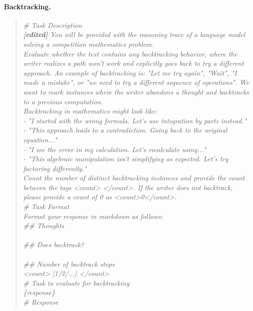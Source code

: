 \paragraph{Backtracking.}
\begin{quote}\small\itshape
\# Task Description\\
\textbf{[edited]} You will be provided with the reasoning trace of a language model solving a competition mathematics problem.\\
Evaluate whether the text contains any backtracking behavior, where the writer realizes a path won't work and explicitly goes back to try a different approach. An example of backtracking is: "Let me try again", "Wait", "I made a mistake", or "we need to try a different sequence of operations". We want to mark instances where the writer abandons a thought and backtracks to a previous computation.\\
\medskip
Backtracking in mathematics might look like:\\
- "I started with the wrong formula. Let's use integration by parts instead."\\
- "This approach leads to a contradiction. Going back to the original equation..."\\
- "I see the error in my calculation. Let's recalculate using..."\\
- "This algebraic manipulation isn't simplifying as expected. Let's try factoring differently."\\
\medskip
Count the number of distinct backtracking instances and provide the count between the tags <count> </count>. If the writer does not backtrack, please provide a count of 0 as <count>0</count>.\\
\medskip
\# Task Format\\
Format your response in markdown as follows:\\
\medskip
\#\# Thoughts\\
[Brief description describing what behavior was noticed and where backtracking occurred]\\
\medskip
\#\# Does backtrack?\\
[yes/no]\\
\medskip
\#\# Number of backtrack steps\\
<count> [1/2/...] </count>\\
\medskip
\# Task to evaluate for backtracking\\
\{response\}\\
\medskip
\# Response\\
\end{quote}

